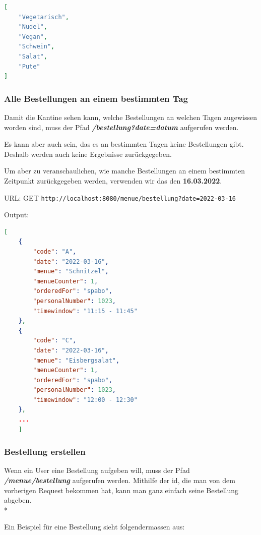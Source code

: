 \begin{lstlisting}[language=json,firstnumber=1]
[
    "Vegetarisch",
    "Nudel",
    "Vegan",
    "Schwein",
    "Salat",
    "Pute"
]
\end{lstlisting}

\subsubsection{Alle Bestellungen an einem bestimmten Tag}

Damit die Kantine sehen kann, welche Bestellungen an welchen Tagen zugewissen worden sind, muss der Pfad \textbf{\textit{/bestellung?date=datum}} aufgerufen werden.

Es kann aber auch sein, das es an bestimmten Tagen keine Bestellungen gibt. Deshalb werden auch keine Ergebnisse zurückgegeben.

Um aber zu veranschaulichen, wie manche Bestellungen an einem bestimmten Zeitpunkt zurückgegeben werden, verwenden wir das den \textbf{16.03.2022}.

URL: GET \colorbox{white}{\lstinline[basicstyle=\ttfamily\color{black},language=html]|http://localhost:8080/menue/bestellung?date=2022-03-16|}

Output:

\begin{lstlisting}[language=json,firstnumber=1]
[
    {
        "code": "A",
        "date": "2022-03-16",
        "menue": "Schnitzel",
        "menueCounter": 1,
        "orderedFor": "spabo",
        "personalNumber": 1023,
        "timewindow": "11:15 - 11:45"
    },
    {
        "code": "C",
        "date": "2022-03-16",
        "menue": "Eisbergsalat",
        "menueCounter": 1,
        "orderedFor": "spabo",
        "personalNumber": 1023,
        "timewindow": "12:00 - 12:30"
    },
    ...
    ]
\end{lstlisting}


\subsubsection{Bestellung erstellen}

Wenn ein User eine Bestellung aufgeben will, muss der Pfad \textbf{\textit{/menue/bestellung}} aufgerufen werden. 
Mithilfe der id, die man von dem vorherigen Request bekommen hat, kann man ganz einfach seine Bestellung abgeben. \\*

Ein Beispiel für eine Bestellung sieht folgendermassen aus:

